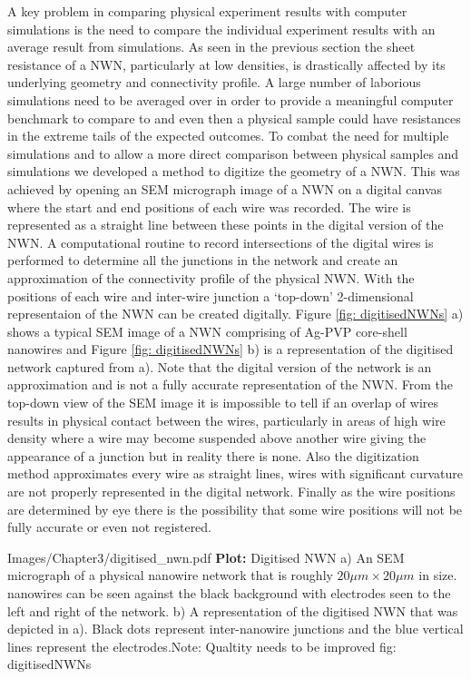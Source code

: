 A key problem in comparing physical experiment results with computer simulations is the need to compare the individual experiment results with an average result from simulations. As seen in the previous section the sheet resistance of a NWN, particularly at low densities, is drastically affected by its underlying geometry and connectivity profile. A large number of laborious simulations need to be averaged over in order to provide a meaningful computer benchmark to compare to and even then a physical sample could have resistances in the extreme tails of the expected outcomes. To combat the need for multiple simulations and to allow a more direct comparison between physical samples and simulations we developed a method to digitize the geometry of a NWN. This was achieved by opening an SEM micrograph image of a NWN on a digital canvas where the start and end positions of each wire was recorded. The wire is represented as a straight line between these points in the digital version of the NWN. A computational routine to record intersections of the digital wires is performed to determine all the junctions in the network and create an approximation of the connectivity profile of the physical NWN. With the positions of each wire and inter-wire junction a `top-down' 2-dimensional representaion of the NWN can be created digitally. Figure \ref{fig: digitisedNWNs} a) shows a typical SEM image of a NWN comprising of Ag-PVP core-shell nanowires and Figure \ref{fig: digitisedNWNs} b) is a representation of the digitised network captured from a). Note that the digital version of the network is an approximation and is not a fully accurate representation of the NWN. From the top-down view of the SEM image it is impossible to tell if an overlap of wires results in physical contact between the wires, particularly in areas of high wire density where a wire may become suspended above another wire giving the appearance of a junction but in reality there is none. Also the digitization method approximates every wire as straight lines, wires with significant curvature are not properly represented in the digital network. Finally as the wire positions are determined by eye there is the possibility that some wire positions will not be fully accurate or even not registered.

{Images/Chapter3/digitised_nwn.pdf}
{\textbf{Plot:} Digitised NWN}
{ a) An SEM micrograph of a physical nanowire network that is roughly $20 \mu m \times 20 \mu m$ in size. nanowires can be seen against the black background with electrodes seen to the left and right of the network. b) A representation of the digitised NWN that was depicted in a). Black dots represent inter-nanowire junctions and the blue vertical lines represent the electrodes.Note: Qualtity needs to be improved}
{fig: digitisedNWNs}


